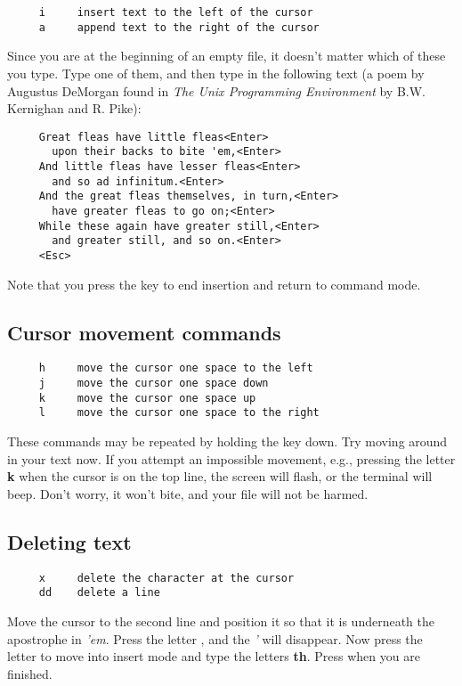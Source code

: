 \begin{verbatim}
     i     insert text to the left of the cursor
     a     append text to the right of the cursor
\end{verbatim}

Since you are at the beginning of an empty file, it doesn't matter 
which of these you type. Type one of them, and then type in the 
following text (a poem by Augustus DeMorgan found in {\em The Unix Programming 
Environment} by B.W. Kernighan and R. Pike):

\begin{verbatim}
     Great fleas have little fleas<Enter>
       upon their backs to bite 'em,<Enter>
     And little fleas have lesser fleas<Enter>
       and so ad infinitum.<Enter>
     And the great fleas themselves, in turn,<Enter>
       have greater fleas to go on;<Enter>
     While these again have greater still,<Enter>
       and greater still, and so on.<Enter>
     <Esc>
\end{verbatim}

Note that you press the  key to end insertion and return 
to command mode.

\subsection{Cursor movement commands}

\begin{verbatim}
     h     move the cursor one space to the left
     j     move the cursor one space down
     k     move the cursor one space up
     l     move the cursor one space to the right
\end{verbatim}

These commands may be repeated by holding the key down. Try moving 
around in your text now. If you attempt an impossible movement, 
e.g., pressing the letter {\bf k} when the cursor is on the top line, 
the screen will flash, or the terminal will beep.  Don't worry, it won't 
bite, and your file will not be harmed.

\subsection{Deleting text}
\begin{verbatim}
     x     delete the character at the cursor
     dd    delete a line
\end{verbatim}

Move the cursor to the second line and position it so that it 
is underneath the apostrophe in {\em 'em}. Press the letter , and 
the {\em '} will disappear. Now press the letter  to move into 
insert mode and type the letters {\bf th}. Press  when you 
are finished.

